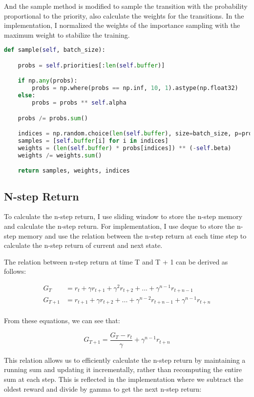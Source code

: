 And the sample method is modified to sample the transition with the probability proportional to the priority, also calculate the weights for the transitions.
In the implementation, I normalized the weights of the importance sampling with the maximum weight to stabilize the training.

\begin{lstlisting}[language=Python]
def sample(self, batch_size):

    probs = self.priorities[:len(self.buffer)]

    if np.any(probs):
        probs = np.where(probs == np.inf, 10, 1).astype(np.float32)
    else:
        probs = probs ** self.alpha

    probs /= probs.sum()

    indices = np.random.choice(len(self.buffer), size=batch_size, p=probs)
    samples = [self.buffer[i] for i in indices]
    weights = (len(self.buffer) * probs[indices]) ** (-self.beta)
    weights /= weights.sum()

    return samples, weights, indices
\end{lstlisting}

\subsection{N-step Return}
To calculate the n-step return, I use sliding window to store the n-step memory and calculate the n-step return.
For implementation, I use deque to store the n-step memory and use the relation between the n-step return at each time step to calculate the n-step return of current and next state.

The relation between n-step return at time T and T + 1 can be derived as follows:

\begin{align*}
G_T &= r_t + \gamma r_{t+1} + \gamma^2 r_{t+2} + ... + \gamma^{n-1} r_{t+n-1} \\
G_{T+1} &= r_{t+1} + \gamma r_{t+2} + ... + \gamma^{n-2} r_{t+n-1} + \gamma^{n-1} r_{t+n} \\
\end{align*}

From these equations, we can see that:

\begin{equation*}
G_{T+1} = \frac{G_T - r_t}{\gamma} + \gamma^{n-1} r_{t+n}
\end{equation*}

This relation allows us to efficiently calculate the n-step return by maintaining a running sum and updating it incrementally, rather than recomputing the entire sum at each step. This is reflected in the implementation where we subtract the oldest reward and divide by gamma to get the next n-step return:



